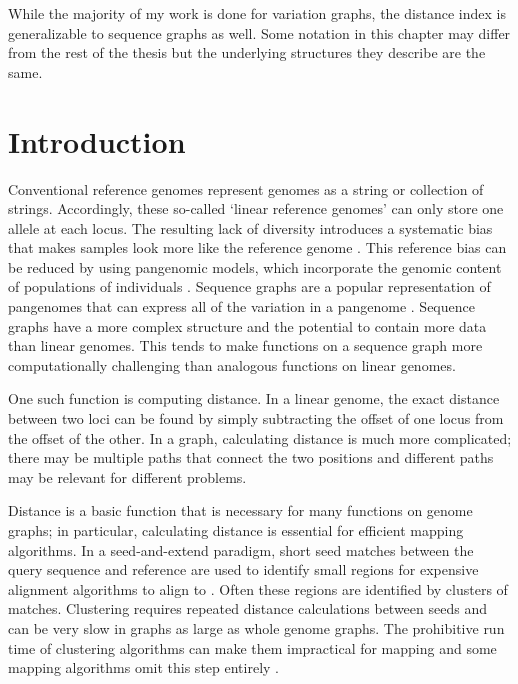 \documentclass[11pt]{ucscthesis}
\begin{document}
While the majority of my work is done for variation graphs, the distance index is generalizable to sequence graphs as well.
Some notation in this chapter may differ from the rest of the thesis but the underlying structures they describe are the same.

\newpage

\section{Introduction}
Conventional reference genomes represent genomes as a string or collection of strings.
Accordingly, these so-called ‘linear reference genomes’ can only store one allele at each locus.
The resulting lack of diversity introduces a systematic bias that makes samples look more like the reference genome \cite{zook_integrating_2014}.
This reference bias can be reduced by using pangenomic models, which incorporate the genomic content of populations of individuals \cite{noauthor_computational_2016}.
Sequence graphs are a popular representation of pangenomes that can express all of the variation in a pangenome \cite{paten_genome_2017}. 
Sequence graphs have a more complex structure and the potential to contain more data than linear genomes.
This tends to make functions on a sequence graph more computationally challenging than analogous functions on linear genomes.

One such function is computing distance.
In a linear genome, the exact distance between two loci can be found by simply subtracting the offset of one locus from the offset of the other.
In a graph, calculating distance is much more complicated; there may be multiple paths that connect the two positions and different paths may be relevant for different problems.

Distance is a basic function that is necessary for many functions on genome graphs; in particular, calculating distance is essential for efficient mapping algorithms.
In a seed-and-extend paradigm, short seed matches between the query sequence and reference are used to identify small regions for expensive alignment algorithms to align to \cite{schneeberger_simultaneous_2009,li_minimap_2016,rakocevic_fast_2019,garrison_vg_2018,vaddadi_read_2019,rautiainen_bit-parallel_2019}. 
Often these regions are identified by clusters of matches. 
Clustering requires repeated distance calculations between seeds and can be very slow in graphs as large as whole genome graphs. 
The prohibitive run time of clustering algorithms can make them impractical for mapping and some mapping algorithms omit this step entirely \cite{rautiainen_bit-parallel_2019}.
\end{document}
